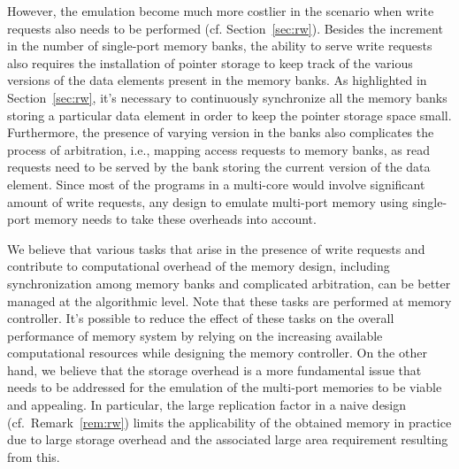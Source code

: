 However, the emulation become much more costlier in the scenario when write requests also needs to be performed (cf. Section~\ref{sec:rw}). Besides the increment in the number of single-port memory banks, the ability to serve write requests also requires the installation of pointer storage to keep track of the various versions of the data elements present in the memory banks. As highlighted in Section~\ref{sec:rw}, it's necessary to continuously synchronize all the memory banks storing a particular data element in order to keep the pointer storage space small.  Furthermore, the presence of varying version in the banks also complicates the process of arbitration, i.e., mapping access requests to memory banks, as read requests need to be served by the bank storing the current version of the data element. Since most of the programs in a multi-core would involve significant amount of write requests, any design to emulate multi-port memory using single-port memory needs to take these overheads into account. 

{\color{red}We believe that various tasks that arise in the presence of write requests and contribute to computational overhead of the memory design, including synchronization among memory banks and complicated arbitration, can be better managed at the algorithmic level. Note that these tasks are performed at memory controller. It's possible to reduce the effect of these tasks on the overall performance of memory system by relying on the increasing available computational resources while designing the memory controller. On the other hand, we believe that the storage overhead is a more fundamental issue that needs to be addressed for the emulation of the multi-port memories to be viable and appealing. In particular, the large replication factor in a naive design (cf.~Remark~\ref{rem:rw}) limits the applicability of the obtained memory in practice due to large storage overhead and the associated large area requirement resulting from this.}

